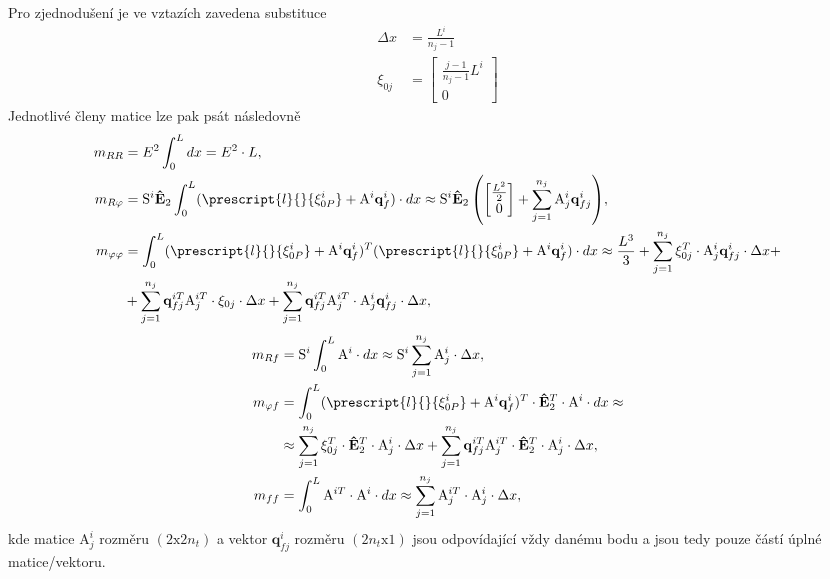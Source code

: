 Pro zjednodušení je ve vztazích zavedena substituce
\begin{align*}
	\Delta x& = \frac{L^i}{n_j -1} \\
	\xi_{0j}& = \begin{bmatrix}
		\frac{j-1}{n_j -1 }L^i  \\ 0
	\end{bmatrix}
\end{align*}
Jednotlivé členy matice lze pak psát následovně
\begin{align}\label{eq:MBS_m}
	m_{RR} &= E^2 \int_0^L dx = E^2 \cdot L ,\\
	m_{R\varphi} &= \mathrm{S}^{i}  \mathbf{\hat{E}}_2 \int_0^L (\prescript{l}{}{\mathbf{\xi}^i_{0P}}  + \mathrm{A}^i \mathbf{q}_f^i) \cdot dx \approx {\mathrm{S}^{i}  \mathbf{\hat{E}}_2 \left(  
		\begin{bmatrix}
			\frac{L^2}{2}\\ 0
		\end{bmatrix}
		+ \sum_{j=1}^{n_j} \mathrm{A}^i_j \mathbf{q}_{fj}^i	\right)} ,\\
	m_{\varphi \varphi} &= \int_0^L (\prescript{l}{}{\mathbf{\xi}^i_{0P}}  + \mathrm{A}^i \mathbf{q}_f^i)^T (\prescript{l}{}{\mathbf{\xi}^i_{0P}}  + \mathrm{A}^i \mathbf{q}_f^i) \cdot dx \approx {\frac{L^3}{3} + \sum_{j=1}^{n_j} \xi_{0j}^T \cdot \mathrm{A}^i_j  \mathbf{q}_{fj}^i \cdot \Delta x} + \notag \\ &+ {\sum_{j=1}^{n_j} \mathbf{q}_{fj}^{iT}  \mathrm{A}^{iT}_j \cdot \xi_{0j} \cdot \Delta x + \sum_{j=1}^{n_j} \mathbf{q}_{fj}^{iT}  \mathrm{A}^{iT}_j \cdot \mathrm{A}^i_j  \mathbf{q}_{fj}^i \cdot \Delta x} ,
\end{align}
\begin{align}
	m_{Rf} &= \mathrm{S}^{i} \int_0^L \mathrm{A}^i \cdot dx \approx {\mathrm{S}^{i} \sum_{j=1}^{n_j} \mathrm{A}^i_j \cdot \Delta x} ,\\
	m_{\varphi f} &= \int_0^L (\prescript{l}{}{\mathbf{\xi}^i_{0P}}  + \mathrm{A}^i \mathbf{q}_f^i)^T \cdot \mathbf{\hat{E}}_2^T \cdot \mathrm{A}^i \cdot dx \approx \notag \\ &\approx {\sum_{j=1}^{n_j} \xi_{0j}^T \cdot \mathbf{\hat{E}}_2^T \cdot \mathrm{A}^i_j \cdot \Delta x + \sum_{j=1}^{n_j} \mathbf{q}_{fj}^{iT}  \mathrm{A}^{iT}_j \cdot \mathbf{\hat{E}}_2^T \cdot \mathrm{A}^i_j \cdot \Delta x} ,\\
	m_{ff} &=  \int_0^L \mathrm{A}^{iT} \cdot \mathrm{A}^i \cdot dx \approx {\sum_{j=1}^{n_j}   \mathrm{A}^{iT}_j \cdot \mathrm{A}^i_j \cdot \Delta x},
\end{align}
kde matice $ \mathrm{A}^i_j $ rozměru $ (2\mathrm{x}2n_t) $ a vektor $ \mathbf{q}_{fj}^{i} $ rozměru $ (2n_t\mathrm{x} 1) $ jsou odpovídající vždy danému bodu a jsou tedy pouze částí úplné matice/vektoru.

